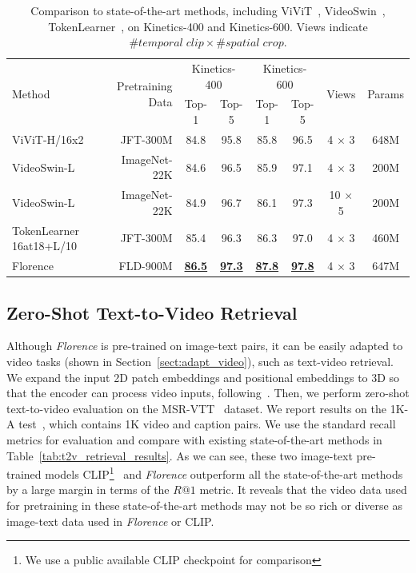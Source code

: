 \documentclass{article}
\begin{document}
\begin{table}[ht]
\centering
\setlength{\tabcolsep}{12pt}
\small
\renewcommand{\arraystretch}{1.35}
\begin{tabular}{l|r|cc|cc|c|c}
\toprule
\multirow{2}{*}{Method} & \multirow{2}{*}{Pretraining Data} & \multicolumn{2}{c|}{Kinetics-400} &
\multicolumn{2}{c|}{Kinetics-600} & \multirow{2}{*}{Views} & \multirow{2}{*}{Params}\\
& & Top-1 & Top-5 & Top-1 & Top-5 & & \\
\midrule
ViViT-H/16x2 & JFT-300M & 84.8 & 95.8 & 85.8 & 96.5 & 4 $\times$ 3 & 648M\\
VideoSwin-L & ImageNet-22K & 84.6 & 96.5 & 85.9 & 97.1 & 4 $\times$ 3 & 200M \\
VideoSwin-L & ImageNet-22K & 84.9 & 96.7 & 86.1 & 97.3 & 10 $\times$ 5 & 200M
\\
TokenLearner 16at18+L/10 & JFT-300M & 85.4 & 96.3 & 86.3 & 97.0 & 4
$\times$ 3 & 460M \\
Florence & FLD-900M & \underline{\bf{86.5}} & \underline{\bf{97.3}} & \underline{\bf{87.8}} &
\underline{\bf{97.8}} & 4 $\times$ 3 & 647M \\
\bottomrule
\end{tabular}
\caption{Comparison to state-of-the-art methods, including ViViT~\cite{arnab2021vivit}, VideoSwin~\cite{liu2021video}, TokenLearner~\cite{ryoo2021tokenlearner}, on Kinetics-400 and Kinetics-600. Views indicate $\#
temporal\;clip \times \# spatial\;crop$. }
\label{tab:k400}
\end{table}


\subsection{Zero-Shot Text-to-Video Retrieval}

Although \emph{Florence} is pre-trained on image-text pairs, it can be easily adapted to video tasks
(shown in Section~\ref{sect:adapt_video}), such as text-video retrieval. We expand the input 2D
patch embeddings and positional embeddings to 3D so that the encoder can process video inputs,
following~\cite{arnab2021vivit}. Then, we perform zero-shot text-to-video evaluation on the
MSR-VTT~\cite{xu2016msr} dataset. We report results on the 1K-A test~\cite{yu2018joint}, which
contains 1K video and caption pairs. We use the standard recall metrics for evaluation and compare
with existing state-of-the-art methods in Table~\ref{tab:t2v_retrieval_results}. As we can see, these
two image-text pre-trained models CLIP\footnote{We use a public available CLIP checkpoint for
comparison}~\cite{radford2021learning} and \emph{Florence} outperform all the state-of-the-art
methods by a large margin in terms of the $R@1$ metric. It reveals that the video data used for
pretraining in these state-of-the-art methods may not be so rich or diverse as image-text data used
in \emph{Florence} or CLIP.
\end{document}
